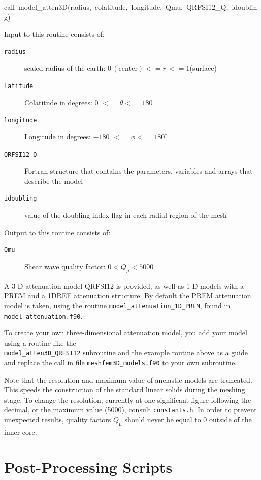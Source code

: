 \documentclass[oneside,english]{book}
\newenvironment{lyxcode}
{\begin{list}{}{
\setlength{\rightmargin}{\leftmargin}
\setlength{\listparindent}{0pt}%
\raggedright
\setlength{\itemsep}{0pt}
\setlength{\parsep}{0pt}
\normalfont\ttfamily}%
 \item[]}
{\end{list}}
\begin{document}
\begin{lyxcode}
call~model\_atten3D(radius,~colatitude,~longitude,~Qmu,~QRFSI12\_Q,~idoubling)
\end{lyxcode}
Input to this routine consists of:

\begin{description}
\item [{\texttt{radius}}] scaled radius of the earth: $0\,(\mathrm{center})<=r\,<=1$(surface)
\item [{\texttt{latitude}}] Colatitude in degrees: $0^{\circ}<=\theta<=180^{\circ}$
\item [{\texttt{longitude}}] Longitude in degrees: $-180^{\circ}<=\phi<=180^{\circ}$
\item [{\texttt{QRFSI12\_Q}}] Fortran structure that contains the parameters,
variables and arrays that describe the model
\item [{\texttt{idoubling}}] value of the doubling index flag in each radial region of the mesh
\end{description}
Output to this routine consists of:

\begin{description}
\item [{\texttt{Qmu}}] Shear wave quality factor: $0<Q_{\mu}<5000$
\end{description}
A 3-D attenuation model QRFSI12 \citep{DaEkDz08}
is provided, as well as 1-D models with a PREM and a 1DREF
attenuation structure. By default the PREM attenuation model is taken,
using the routine \texttt{model\_attenuation\_1D\_PREM},
found in \texttt{model\_attenuation.f90}.

To create your own three-dimensional attenuation model, you add your model
using a routine like the ~\\
\texttt{model\_atten3D\_QRFSI12} subroutine
and the example routine above as a guide and replace the call in file
\texttt{meshfem3D\_models.f90} to your own subroutine.

Note that the resolution and maximum value of anelastic models are
truncated. This speeds the construction of the standard linear solids
during the meshing stage. To change the resolution, currently at one
significant figure following the decimal, or the maximum value (5000),
consult \texttt{constants.h}. In order to prevent unexpected results,
quality factors $Q_{\mu}$ should never be equal to 0 outside of the
inner core.


\chapter{Post-Processing Scripts}
\end{document}
